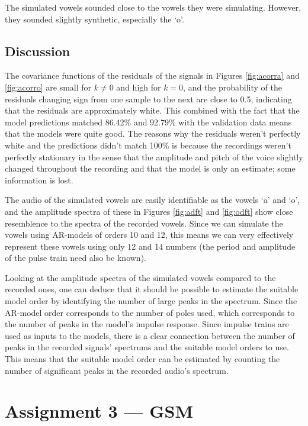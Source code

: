 \documentclass{IEEEtran}
\begin{document}
The simulated vowels sounded close to the vowels they were simulating.
However, they sounded slightly synthetic, especially the `o'.

\subsection{Discussion}

The covariance functions of the residuals of the signals in Figures
\ref{fig:acorra} and \ref{fig:acorro} are small for $k \neq 0$ and
high for $k=0$, and the probability of the residuals changing sign from
one sample to the next are close to 0.5, indicating that the residuals are
approximately white. This combined with the fact that the model predictions
matched 86.42\% and 92.79\% with the validation data means that the models
were quite good. The reasons why the residuals weren't perfectly white and
the predictions didn't match 100\% is because the recordings weren't perfectly
stationary in the sense that the amplitude and pitch of the voice slightly
changed throughout the recording and that the model is only an estimate; some
information is lost.

The audio of the simulated vowels are easily identifiable as the vowels
`a' and `o', and the amplitude spectra of these in Figures \ref{fig:adft} and
\ref{fig:odft} show close resemblence to the spectra of the recorded vowels.
Since we can simulate the vowels using AR-models of orders 10 and 12, this
means we can very effectively represent these vowels using only 12 and 14
numbers (the period and amplitude of the pulse train need also be known).

Looking at the amplitude spectra of the simulated vowels compared to the
recorded ones, one can deduce that it should be possible to estimate the
suitable model order by identifying the number of large peaks in the
spectrum. Since the AR-model order corresponds to the number of poles used,
which corresponds to the number of peaks in the model's impulse response. Since
impulse trains are used as inputs to the models, there is a clear connection
between the number of peaks in the recorded signals' spectrums and the
suitable model orders to use. This means that the suitable model order
can be estimated by counting the number of significant peaks in the
recorded audio's spectrum.

\section{Assignment 3 --- GSM}
\end{document}

